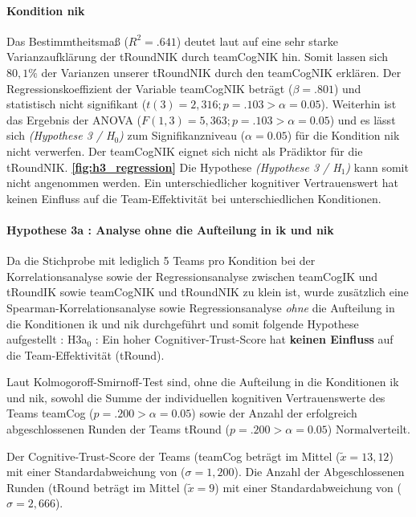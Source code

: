 \documentclass[a4paper,11pt]{article}%
\renewcommand{\\}{\vspace*{0.5\baselineskip} \newline}
\begin{document}
\paragraph{Kondition \ac{nik}}
Das Bestimmtheitsmaß ($R^{2} = .641$) deutet laut \citep{cohen2013statistical} auf eine sehr starke Varianzaufklärung der \ac{tRoundNIK} durch \ac{teamCogNIK} hin. Somit lassen sich $80,1\%$ der Varianzen unserer \ac{tRoundNIK} durch den \ac{teamCogNIK} erklären. \\
Der Regressionskoeffizient der Variable \ac{teamCogNIK} beträgt ($\beta = .801$) und statistisch nicht signifikant ($t(3) = 2,316; p = .103 > \alpha = 0.05$). \\
Weiterhin ist das Ergebnis der ANOVA ($F(1,3) = 5,363; p = .103 > \alpha = 0.05$) und es lässt sich \textit{(Hypothese 3 / H$_{0}$)} zum Signifikanzniveau ($\alpha = 0.05$) für die Kondition \ac{nik} nicht verwerfen. \\
Der \ac{teamCogNIK} eignet sich nicht als Prädiktor für die \ac{tRoundNIK}.
\textbf{\autoref{fig:h3_regression}}\\
Die Hypothese \textit{(Hypothese 3 / H$_{1}$)} kann somit nicht angenommen werden. Ein unterschiedlicher kognitiver Vertrauenswert hat keinen Einfluss auf die Team-Effektivität bei unterschiedlichen Konditionen.

\paragraph{Hypothese 3a : Analyse ohne die Aufteilung in \ac{ik} und \ac{nik} }
Da die Stichprobe mit lediglich 5 Teams pro Kondition bei der Korrelationsanalyse sowie der Regressionsanalyse zwischen \ac{teamCogIK} und \ac{tRoundIK} sowie \ac{teamCogNIK} und \ac{tRoundNIK} zu klein ist, wurde zusätzlich eine Spearman-Korrelationsanalyse sowie Regressionsanalyse \textit{ohne} die Aufteilung in die Konditionen \ac{ik} und \ac{nik} durchgeführt und somit folgende Hypothese aufgestellt :\\
H3a$_{0}$ : Ein hoher Cognitiver-Trust-Score hat \textbf{keinen Einfluss} auf die Team-Effektivität (\ac{tRound}).

Laut Kolmogoroff-Smirnoff-Test sind, ohne die Aufteilung in die Konditionen \ac{ik} und \ac{nik}, sowohl die Summe der individuellen kognitiven Vertrauenswerte des Teams \ac{teamCog} ($p = .200 > \alpha = 0.05$) sowie der Anzahl der erfolgreich abgeschlossenen Runden der Teams \ac{tRound} ($p = .200 > \alpha = 0.05$) Normalverteilt.

Der Cognitive-Trust-Score der Teams (\ac{teamCog} beträgt im Mittel ($\tilde x = 13,12$) mit einer Standardabweichung von ($\sigma = 1,200$).
Die Anzahl der Abgeschlossenen Runden (\ac{tRound} beträgt im Mittel ($\tilde x = 9$) mit einer Standardabweichung von ($\sigma = 2,666$). 
\end{document}
